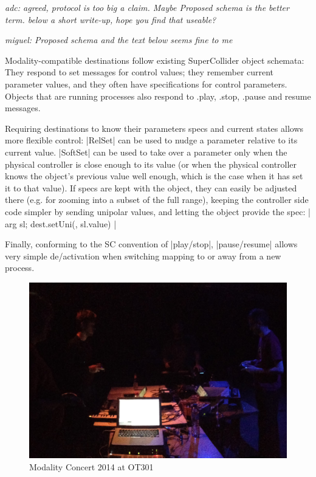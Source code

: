 \documentclass{article}
\begin{document}
\emph{adc: agreed, protocol is too big a claim. Maybe Proposed schema is the better term. below a short write-up, hope you find that useable?}

\emph{miguel: Proposed schema and the text below  seems fine to me}

Modality-compatible destinations follow existing SuperCollider object schemata: They respond to set messages for control values; they remember current parameter values, and they often have specifications for control parameters. Objects that are running processes also respond to .play, .stop, .pause and resume messages. 

Requiring destinations to know their parameters specs and current states allows more flexible control: 
|RelSet| can be used to nudge a parameter relative to its current value. 
|SoftSet| can be used to take over a parameter only when the physical controller is close enough to its value (or when the physical controller knows the object's previous value well enough, which is the case when it has set it to that value). 
If specs are kept with the object, they can easily be adjusted there (e.g. for zooming into a subset of the full range), keeping the controller side code simpler by sending unipolar values, and letting the object provide the spec:  
|{ arg sl; dest.setUni(\freq, sl.value) }|

Finally, conforming to the SC convention of |play/stop|, |pause/resume| allows very simple de/activation when switching mapping to or away from a new process. 

\begin{figure}[h]
	\centering
		\includegraphics[width=.9\columnwidth]{../media/20140405-IMG_1691.jpg}
	\caption{Modality Concert 2014 at OT301}
	\label{fig:media_20140405-IMG_1691}
\end{figure}
\end{document}
